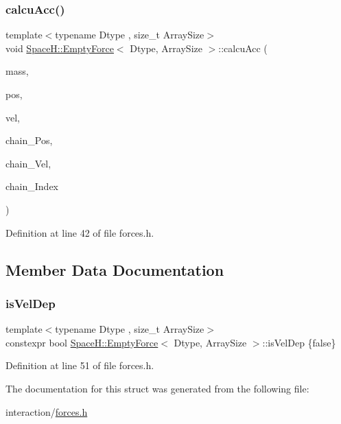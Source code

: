 \subsubsection{\texorpdfstring{calcu\+Acc()}{calcuAcc()}\hspace{0.1cm}{\footnotesize\ttfamily [4/4]}}
{\footnotesize\ttfamily template$<$typename Dtype , size\+\_\+t Array\+Size$>$ \\
void \mbox{\hyperlink{struct_space_h_1_1_empty_force}{Space\+H\+::\+Empty\+Force}}$<$ Dtype, Array\+Size $>$\+::calcu\+Acc (\begin{DoxyParamCaption}\item[{const \mbox{\hyperlink{struct_space_h_1_1_empty_force_afdeb66410650cdb1e2e3b1e1fd79540c}{Scalar\+Array}} \&}]{mass,  }\item[{const \mbox{\hyperlink{struct_space_h_1_1_empty_force_a06ad868879a6fa5def9c7f9fd75fffde}{Vector\+Array}} \&}]{pos,  }\item[{const \mbox{\hyperlink{struct_space_h_1_1_empty_force_a06ad868879a6fa5def9c7f9fd75fffde}{Vector\+Array}} \&}]{vel,  }\item[{const \mbox{\hyperlink{struct_space_h_1_1_empty_force_a06ad868879a6fa5def9c7f9fd75fffde}{Vector\+Array}} \&}]{chain_\+Pos,  }\item[{const \mbox{\hyperlink{struct_space_h_1_1_empty_force_a06ad868879a6fa5def9c7f9fd75fffde}{Vector\+Array}} \&}]{chain_\+Vel,  }\item[{const \mbox{\hyperlink{struct_space_h_1_1_empty_force_a25e0bd933dd3715e315c1abdb6843c36}{Index\+Array}} \&}]{chain_\+Index }\end{DoxyParamCaption})\hspace{0.3cm}{\ttfamily [inline]}}



Definition at line 42 of file forces.\+h.



\subsection{Member Data Documentation}
\mbox{\label{struct_space_h_1_1_empty_force_a9c02c91b7ec657b88c89ef02307ca4b5}} 
\subsubsection{\texorpdfstring{is\+Vel\+Dep}{isVelDep}}
{\footnotesize\ttfamily template$<$typename Dtype , size\+\_\+t Array\+Size$>$ \\
constexpr bool \mbox{\hyperlink{struct_space_h_1_1_empty_force}{Space\+H\+::\+Empty\+Force}}$<$ Dtype, Array\+Size $>$\+::is\+Vel\+Dep \{false\}\hspace{0.3cm}{\ttfamily [static]}}



Definition at line 51 of file forces.\+h.



The documentation for this struct was generated from the following file\+:\begin{DoxyCompactItemize}
\item 
interaction/\mbox{\hyperlink{forces_8h}{forces.\+h}}\end{DoxyCompactItemize}
